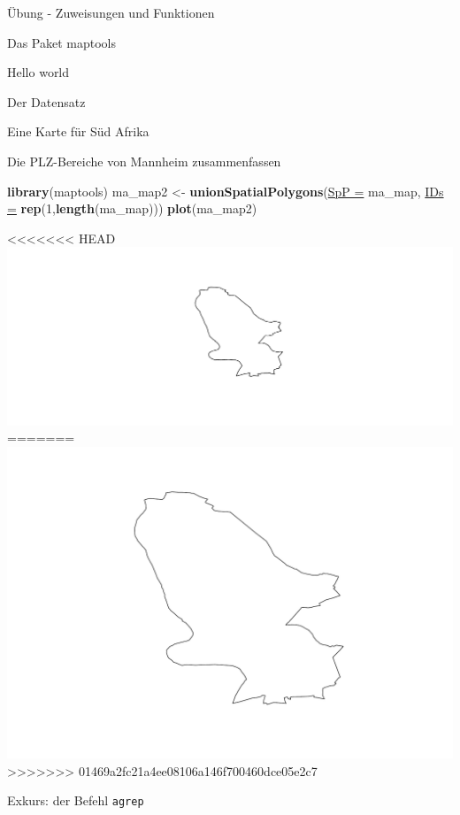 \documentclass[ignorenonframetext,]{beamer}
\newenvironment{Shaded}{\begin{snugshade}}{\end{snugshade}}
\newcommand{\DataTypeTok}[1]{\textcolor[rgb]{0.74,0.68,0.62}{\underline{#1}}}
\newcommand{\DecValTok}[1]{\textcolor[rgb]{0.27,0.67,0.26}{#1}}
\newcommand{\KeywordTok}[1]{\textcolor[rgb]{0.26,0.66,0.93}{\textbf{#1}}}
\newcommand{\NormalTok}[1]{\textcolor[rgb]{0.74,0.68,0.62}{#1}}
\newcommand{\OperatorTok}[1]{\textcolor[rgb]{0.74,0.68,0.62}{#1}}
\newcommand{\StringTok}[1]{\textcolor[rgb]{0.02,0.61,0.04}{#1}}
\begin{document}
\begin{frame}[fragile]{Übung - Zuweisungen und Funktionen}
\begin{frame}[fragile]{Das Paket maptools}
\begin{frame}[fragile]{Hello world}
\begin{frame}[fragile]{Der Datensatz}
\begin{frame}[fragile]{Eine Karte für Süd Afrika}
\begin{frame}[fragile]{Die PLZ-Bereiche von Mannheim zusammenfassen}
\begin{Shaded}
\begin{Highlighting}[]
\KeywordTok{library}\NormalTok{(maptools)}
\NormalTok{ma_map2 <-}\StringTok{ }\KeywordTok{unionSpatialPolygons}\NormalTok{(}\DataTypeTok{SpP =}\NormalTok{ ma_map,}
                                \DataTypeTok{IDs =} \KeywordTok{rep}\NormalTok{(}\DecValTok{1}\NormalTok{,}\KeywordTok{length}\NormalTok{(ma_map)))}
\KeywordTok{plot}\NormalTok{(ma_map2)}
\end{Highlighting}
\end{Shaded}

<<<<<<< HEAD
\includegraphics{Geomedizin_files/figure-beamer/unnamed-chunk-119-1.pdf}
=======
\includegraphics{Geomedizin_files/figure-beamer/unnamed-chunk-140-1.pdf}
>>>>>>> 01469a2fc21a4ee08106a146f700460dce05e2c7

\end{frame}

\begin{frame}[fragile]{Exkurs: der Befehl \texttt{agrep}}
\protect\hypertarget{exkurs-der-befehl-agrep}{}

\begin{Shaded}
\end{Shaded}


\end{frame}
\end{frame}
\end{frame}
\end{frame}
\end{frame}
\end{frame}
\end{document}
